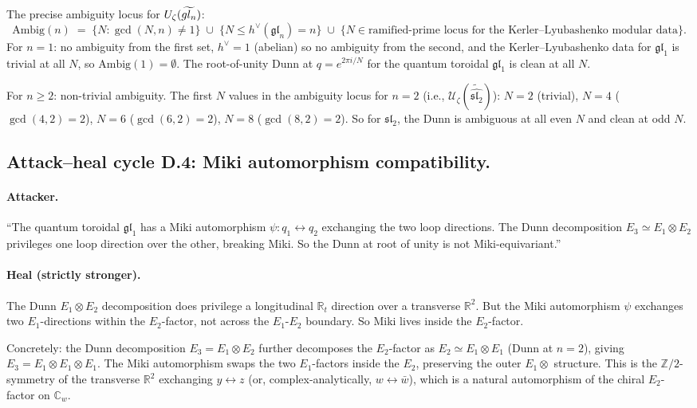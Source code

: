\documentclass[11pt]{article}
\newcommand{\Eone}{E_{1}}
\newcommand{\Etwo}{E_{2}}
\newcommand{\Ethree}{E_{3}}
\newcommand{\R}{\mathbb{R}}
\newcommand{\C}{\mathbb{C}}
\newcommand{\Z}{\mathbb{Z}}
\newcommand{\cU}{\mathcal{U}}
\newcommand{\fgl}{\mathfrak{gl}}
\newcommand{\fsl}{\mathfrak{sl}}
\begin{document}
The precise ambiguity locus for $\cU_\zeta(\widetilde{\widehat\fgl_n})$:
\[
  \mathrm{Ambig}(n) \;=\; \{N : \gcd(N, n) \neq 1\}
  \;\cup\; \{N \leq h^\vee(\fgl_n) = n\}
  \;\cup\; \{N \in \text{ramified-prime locus for the Kerler--Lyubashenko modular data}\}.
\]
For $n = 1$: no ambiguity from the first set, $h^\vee = 1$ (abelian)
so no ambiguity from the second, and the Kerler--Lyubashenko data for
$\fgl_1$ is trivial at all $N$, so $\mathrm{Ambig}(1) = \emptyset$.
The root-of-unity Dunn at $q = e^{2\pi i/N}$ for the quantum toroidal
$\fgl_1$ is clean at all $N$.

For $n \geq 2$: non-trivial ambiguity. The first $N$ values in the
ambiguity locus for $n = 2$ (i.e., $\cU_\zeta(\widetilde{\widehat{\fsl_2}})$):
$N = 2$ (trivial), $N = 4$ ($\gcd(4, 2) = 2$), $N = 6$ ($\gcd(6, 2) = 2$),
$N = 8$ ($\gcd(8, 2) = 2$). So for $\fsl_2$, the Dunn is ambiguous at
all even $N$ and clean at odd $N$.

\subsection{Attack--heal cycle D.4: Miki automorphism compatibility.}

\paragraph{Attacker.}
``The quantum toroidal $\fgl_1$ has a Miki automorphism $\psi : q_1
\leftrightarrow q_2$ exchanging the two loop directions. The Dunn
decomposition $\Ethree \simeq \Eone \otimes \Etwo$ privileges one
loop direction over the other, breaking Miki. So the Dunn at root of
unity is not Miki-equivariant.''

\paragraph{Heal (strictly stronger).}
The Dunn $\Eone \otimes \Etwo$ decomposition does privilege a
longitudinal $\R_t$ direction over a transverse $\R^2$. But the Miki
automorphism $\psi$ exchanges two $\Eone$-directions within the
$\Etwo$-factor, not across the $\Eone$-$\Etwo$ boundary. So Miki lives
inside the $\Etwo$-factor.

Concretely: the Dunn decomposition $\Ethree = \Eone \otimes \Etwo$
further decomposes the $\Etwo$-factor as $\Etwo \simeq \Eone \otimes
\Eone$ (Dunn at $n = 2$), giving $\Ethree = \Eone \otimes \Eone \otimes
\Eone$. The Miki automorphism swaps the two $\Eone$-factors inside the
$\Etwo$, preserving the outer $\Eone \otimes$ structure. This is the
$\Z/2$-symmetry of the transverse $\R^2$ exchanging $y \leftrightarrow
z$ (or, complex-analytically, $w \leftrightarrow \bar w$), which is a
natural automorphism of the chiral $\Etwo$-factor on $\C_w$.
\end{document}
